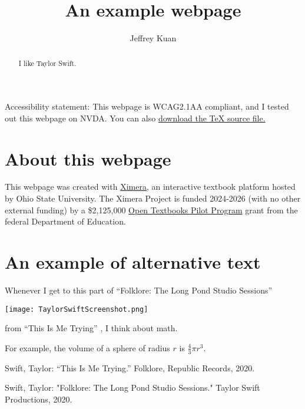 \documentclass{ximera}
\author{Jeffrey Kuan}
\title{An example webpage}
\begin{document}
\begin{abstract}
   I like Taylor Swift.
\end{abstract}
\maketitle


Accessibility statement: This webpage is WCAG2.1AA compliant, and I tested out this webpage on NVDA. 
You can also \href{https://ximera.osu.edu/firststeps24html/aFirstStepInXimera/basics/MAA_AMS_Example.tex}{download the TeX source file.}

\section{About this webpage}
This webpage was created with \href{https://ximera.osu.edu/}{Ximera}, an 
interactive textbook platform hosted by Ohio State University. The Ximera Project is funded 2024-2026 (with no other external funding) by a 
\$2,125,000 \href{https://www.ed.gov/grants-and-programs/grants-higher-education/improvement-postsecondary-education/open-textbooks-pilot-program}{Open Textbooks Pilot Program} grant from the federal Department of Education.



\section{An example of alternative text}
Whenever I get to this part of ``Folklore: The Long Pond Studio Sessions'' \cite{F:LPSS} 

\texttt{[image: TaylorSwiftScreenshot.png]}

from ``This Is Me Trying'' \cite{TS8}, I think about math. 

For example, the volume of a sphere of radius \(r\) is \(\frac{4}{3}\pi r^3.\)

\begin{thebibliography}{10}

 Swift, Taylor: “This Is Me Trying.” Folklore, Republic Records, 2020.

 Swift, Taylor: "Folklore: The Long Pond Studio Sessions." Taylor Swift Productions, 2020. 

\end{thebibliography}
\end{document}
